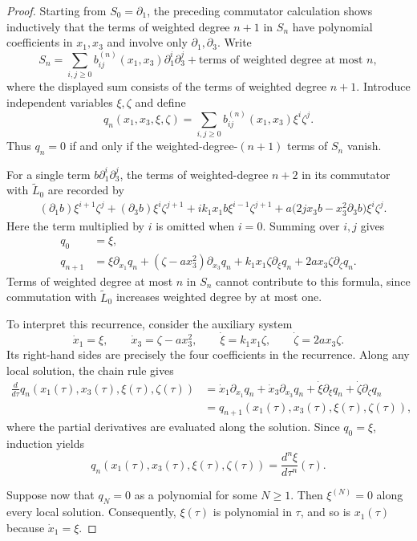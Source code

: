 \documentclass{tCON2e}
\newenvironment{revision}{\begingroup\color{black}}{\endgroup}
\numberwithin{equation}{section}
\theoremstyle{journalplain}
\theoremstyle{journaldef}
\newenvironment{revision}{}{}
\begin{document}
\begin{revision}
\begin{proof}
Starting from $S_0=\partial_1$, the preceding commutator
calculation shows inductively that the terms of weighted
degree $n+1$ in $S_n$ have polynomial coefficients in
$x_1,x_3$ and involve only $\partial_1,\partial_3$.
Write
\[
S_n=\sum_{i,j\ge0}
b_{ij}^{(n)}(x_1,x_3)\partial_1^i\partial_3^j
+\text{terms of weighted degree at most }n,
\]
where the displayed sum consists of the terms of weighted
degree $n+1$. Introduce independent variables $\xi,\zeta$
and define
\[
q_n(x_1,x_3,\xi,\zeta)
=\sum_{i,j\ge0}b_{ij}^{(n)}(x_1,x_3)\xi^i\zeta^j.
\]
Thus $q_n=0$ if and only if the weighted-degree-$(n+1)$
terms of $S_n$ vanish.

For a single term $b\partial_1^i\partial_3^j$,
the terms of weighted-degree $n+2$ in its commutator
with $\widetilde L_0$ are recorded by
\[
\begin{aligned}
&(\partial_1b)\xi^{i+1}\zeta^j
+(\partial_3b)\xi^i\zeta^{j+1}
+i k_1x_1b\xi^{i-1}\zeta^{j+1}
+a\bigl(2j x_3b-x_3^2\partial_3b\bigr)\xi^i\zeta^j.
\end{aligned}
\]
Here the term multiplied by $i$ is omitted when $i=0$.
Summing over $i,j$ gives
\[
\begin{aligned}
q_0&=\xi,\\
q_{n+1}
&=\xi\partial_{x_1}q_n
+(\zeta-a x_3^2)\partial_{x_3}q_n
+k_1x_1\zeta\partial_\xi q_n
+2a x_3\zeta\partial_\zeta q_n.
\end{aligned}
\]
Terms of weighted degree at most $n$ in $S_n$ cannot
contribute to this formula, since commutation with
$\widetilde L_0$ increases weighted degree by at most one.

To interpret this recurrence, consider the auxiliary system
\[
\dot x_1=\xi,\qquad
\dot x_3=\zeta-a x_3^2,\qquad
\dot\xi=k_1x_1\zeta,\qquad
\dot\zeta=2a x_3\zeta.
\]
Its right-hand sides are precisely the four coefficients
in the recurrence. Along any local solution, the chain rule gives
\[
\begin{aligned}
\frac{d}{d\tau}
q_n(x_1(\tau),x_3(\tau),\xi(\tau),\zeta(\tau))
&=\dot x_1\partial_{x_1}q_n
+\dot x_3\partial_{x_3}q_n
+\dot\xi\partial_\xi q_n
+\dot\zeta\partial_\zeta q_n\\
&=q_{n+1}(x_1(\tau),x_3(\tau),\xi(\tau),\zeta(\tau)),
\end{aligned}
\]
where the partial derivatives are evaluated along the solution.
Since $q_0=\xi$, induction yields
\[
q_n(x_1(\tau),x_3(\tau),\xi(\tau),\zeta(\tau))
=\frac{d^n\xi}{d\tau^n}(\tau).
\]

Suppose now that $q_N=0$ as a polynomial for some $N\ge1$.
Then $\xi^{(N)}=0$ along every local solution.
Consequently, $\xi(\tau)$ is polynomial in $\tau$,
and so is $x_1(\tau)$ because $\dot x_1=\xi$.


\end{proof}
\end{revision}
\end{document}
